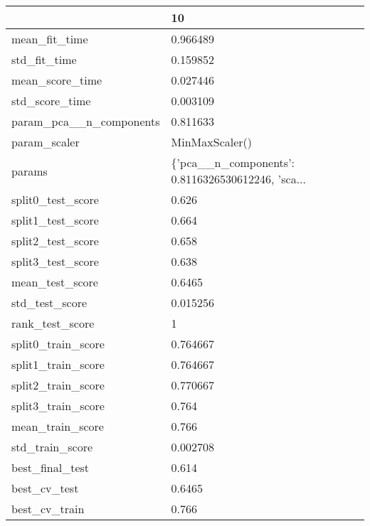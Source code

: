 \begin{tabular}{ll}
\toprule
{} &                                                 10 \\
\midrule
mean\_fit\_time           &                                           0.966489 \\
std\_fit\_time            &                                           0.159852 \\
mean\_score\_time         &                                           0.027446 \\
std\_score\_time          &                                           0.003109 \\
param\_pca\_\_n\_components &                                           0.811633 \\
param\_scaler            &                                     MinMaxScaler() \\
params                  &  \{'pca\_\_n\_components': 0.8116326530612246, 'sca... \\
split0\_test\_score       &                                              0.626 \\
split1\_test\_score       &                                              0.664 \\
split2\_test\_score       &                                              0.658 \\
split3\_test\_score       &                                              0.638 \\
mean\_test\_score         &                                             0.6465 \\
std\_test\_score          &                                           0.015256 \\
rank\_test\_score         &                                                  1 \\
split0\_train\_score      &                                           0.764667 \\
split1\_train\_score      &                                           0.764667 \\
split2\_train\_score      &                                           0.770667 \\
split3\_train\_score      &                                              0.764 \\
mean\_train\_score        &                                              0.766 \\
std\_train\_score         &                                           0.002708 \\
best\_final\_test         &                                              0.614 \\
best\_cv\_test            &                                             0.6465 \\
best\_cv\_train           &                                              0.766 \\
\bottomrule
\end{tabular}
